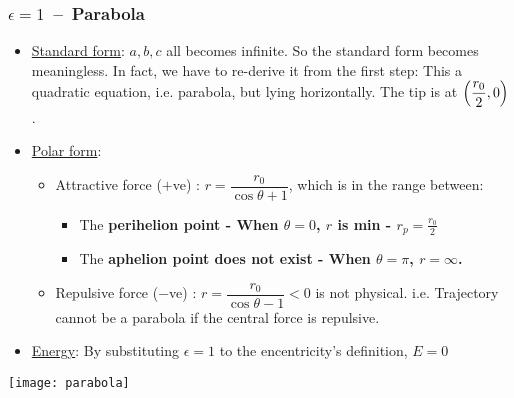 \documentclass[class=article, crop=false, 12pt]{standalone}
\begin{document}
\subsubsection{$\epsilon=1$ \,--\, Parabola}

\begin{itemize}
    

    \item \ul{Standard form}: $a,b,c$ all becomes infinite. 
    So the standard form becomes meaningless. 
    In fact, we have to re-derive it from the first step:
    This a quadratic equation, i.e. parabola, but lying horizontally. 
    The tip is at $\qty(\dfrac{r_0}{2},0)$.

    \item \ul{Polar form}:
    \begin{itemize}
        \item Attractive force ($+$ve) : $r=\dfrac{r_0}{\cos\theta + 1}$,
        which is in the range between:
        \begin{itemize}
            \item The \bf{perihelion} point - When $\theta=0$, $r$ is min - $\boxed{r_p = \frac{r_0}{2}}$
            
            \item The \bf{aphelion} point does not exist - When $\theta=\pi$, $r=\infty$.
        \end{itemize}
    
        \item Repulsive force ($-$ve) : $r=\dfrac{r_0}{\cos\theta - 1} <0$ is not physical. 
        i.e. Trajectory cannot be a parabola if the central force is repulsive.

    \end{itemize}

    \item \ul{Energy}: By substituting $\epsilon=1$ to the encentricity's definition, $\boxed{E=0}$


\end{itemize}

\begin{center}
    \begin{minipage}{0.8\linewidth}
        \centering
        \texttt{[image: parabola]}
    \end{minipage}
\end{center}
\end{document}
